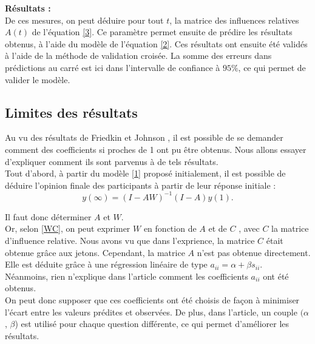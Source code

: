 \documentclass{scrreprt}
\begin{document}
\textbf{Résultats :} \\

De ces mesures, on peut déduire pour tout $t$, la matrice des influences relatives $A(t)$ de l'équation \eqref{3}. Ce paramètre permet ensuite de prédire les résultats obtenus, à l'aide du modèle de l'équation \eqref{2}. Ces résultats ont ensuite été validés à l'aide de la méthode de validation croisée. La somme des erreurs dans prédictions au carré est ici dans l'intervalle de confiance à $95\%$, ce qui permet de valider le modèle.\\

\subsection{Limites des résultats}

Au vu des résultats de Friedkin et Johnson \cite{FJ}, il est possible de se demander comment des coefficients si proches de 1 ont pu être obtenus. Nous allons essayer d'expliquer comment ils sont parvenus à de tels résultats.\\

Tout d’abord, à partir du modèle \eqref{1} proposé initialement, il est possible de déduire l'opinion finale des participants à partir de leur réponse initiale :\\

\begin{equation}
\label{4}
y(\infty) =(I-AW)^{-1}(I-A)y(1).
\end{equation}

Il faut donc déterminer $A$ et $W$.\\

Or, selon \eqref{WC}, on peut exprimer $W$ en fonction de $A$ et de $C$ , avec $C$ la matrice d’influence relative. Nous avons vu que dans l'exprience, la matrice $C$ était obtenue grâce aux jetons. Cependant, la matrice $A$ n'est pas obtenue directement. Elle est déduite grâce à une régression linéaire de type $a_{ii} = \alpha + \beta s_{ii}$.\\

Néanmoins, rien n’explique dans l’article comment les coefficients $a_{ii}$ ont été obtenus.\\

On peut donc supposer que ces coefficients ont été choisis de façon à minimiser l'écart entre les valeurs prédites et observées. De plus, dans l'article, un couple $(\alpha$, $\beta$) est utilisé pour chaque question différente, ce qui permet d'améliorer les résultats.\\
\end{document}
